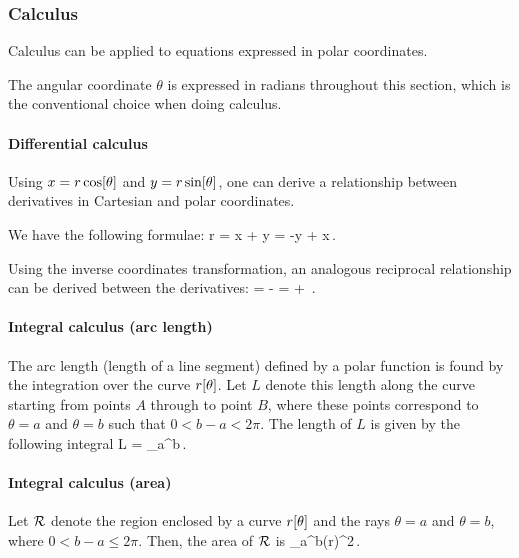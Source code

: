 \subsubsection{Calculus}
Calculus can be applied to equations expressed in polar coordinates.

The angular coordinate $\theta$ is expressed in radians throughout this section, which is the conventional choice when doing calculus.


\paragraph{Differential calculus}
Using $x = r \cos\!\left[{\theta}\right]$ and $y = r \sin\!\left[{\theta}\right]$, one can derive a relationship between derivatives in Cartesian and polar coordinates.

We have the following formulae:
\beq
    r =  x + y\qquad{}\qquad
\xpd{}{\theta} = -y + x\,.
\eeq

Using the inverse coordinates transformation, an analogous reciprocal relationship can be derived between the derivatives:
\beq
{} = \cos\vat\theta{} - \sin\vat\theta\xpd{}{\theta}\qquad{}\qquad
{} = \sin\vat\theta{} + \cos\vat\theta\xpd{}{\theta}\,.
\eeq


\paragraph{Integral calculus (arc length)}
The arc length (length of a line segment) defined by a polar function is found by the integration over the curve $r\!\left[{\theta}\right]$. Let $L$ denote this length along the curve starting from points $A$ through to point $B$, where these points correspond to $\theta = a$ and $\theta = b$ such that $0 < b - a < 2\pi$. The length of $L$ is given by the following integral
\beq
L = \int_a^b\;\dx\theta\,.
\eeq


\paragraph{Integral calculus (area)}
Let $\mathcal{R}$ denote the region enclosed by a curve $r\!\left[{\theta}\right]$ and the rays $\theta = a$ and $\theta = b$, where $0 < b - a ≤ 2\pi$. Then, the area of $\mathcal{R}$ is
\beq
{}\int_a^b\left(r\vat\theta\right)^2\;\dx\theta\,.
\eeq


